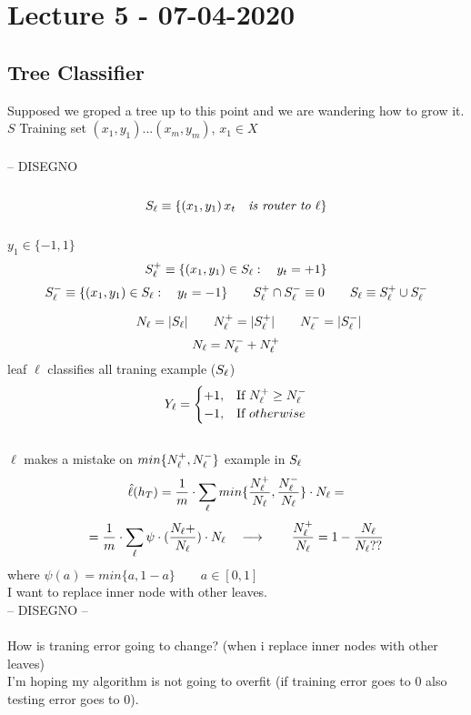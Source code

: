 \documentclass[../main.tex]{subfiles}
\begin{document}
\section{Lecture 5 - 07-04-2020}

\subsection{Tree Classifier}

Supposed we groped a tree up to this point and we are wandering how to
grow it.
\\
$S$ Training set $(x_1,y_1)...(x_m,y_m)$, $x_1 \in X$
\\\\
-- DISEGNO
\\\\
$$
S_{\ell} \equiv \{(x_1,y_1) \, x_t \quad \textit{is router to } \ell \}
$$
\\
$y_1 \in \{-1,1\}$
\\
$$
S_{\ell} ^+ \equiv \{(x_1,y_1) \in S_{\ell} : \quad y_t = +1 \} 
$$
$$
S_{\ell}^- \equiv \{(x_1,y_1) \in S_{\ell} : \quad  y_t = -1 \} 
\qquad
S_{\ell}^+ \cap S_{\ell}^- \equiv 0 \qquad S_{\ell} \equiv S_{\ell}^+ \cup S_{\ell}^-
$$

$$
\qquad N_{\ell} = | S_{\ell}| 
\qquad N_{\ell}^+ = |S_{\ell}^+| 
\qquad  N_{\ell}^- = |S_{\ell}^-| $$
$$
N_{\ell} = N_{\ell}^- + N_{\ell}^+
$$
leaf $\ell$ classifies all traning example ($S_{\ell}$)
\\
$$
Y_{\ell} = 
\begin{cases}
+1, & \mbox{If } N_{\ell}^+ \geq N_{\ell}^- 
\\
-1, & \mbox{If } otherwise
\end{cases}
$$
\\
$\ell$ makes a mistake on $min \{N_{\ell}^+, N_{\ell}^- \}$ example in $S_{\ell}$
$$
\hat{\ell}(h_T) = \frac{1}{m} 
\cdot \sum_{\ell}{} min \{ \frac{N_{\ell}^+}{N_{\ell}} , \frac{N_{\ell}^-}{N_{\ell}} \} \cdot N_{\ell} =
$$
$$
= \frac{1}{m} \cdot \sum_{\ell}{}\psi \cdot (\frac{N_{\ell}+}{N_{\ell}}) \cdot N_{\ell} \quad \longrightarrow  \qquad \frac{N_{\ell}^+}{N_{\ell}} = 1 - \frac{N_{\ell}}{N_{\ell} ??}
$$
where $\psi(a) = min \{a, 1-a \} \qquad a \in [0,1] $
\\
I want to replace inner node with other leaves.
\\
-- DISEGNO --
\\\\
How is traning error going to change?
(when i replace inner nodes with other leaves)
\\
I’m hoping my algorithm is not going to overfit (if training error goes to 0 also
testing error goes to 0).\\
\end{document}
